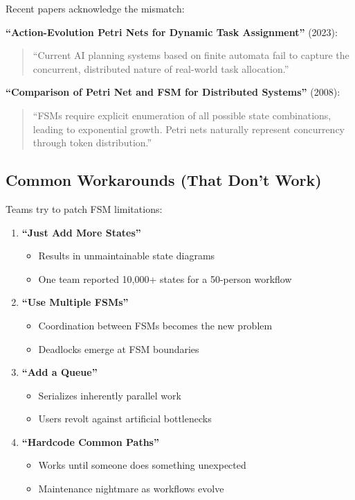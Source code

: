 \documentclass[11pt,a4paper]{article}
\begin{document}
Recent papers acknowledge the mismatch:

\textbf{``Action-Evolution Petri Nets for Dynamic Task Assignment''} (2023):
\begin{quote}
``Current AI planning systems based on finite automata fail to capture the concurrent, distributed nature of real-world task allocation.''
\end{quote}

\textbf{``Comparison of Petri Net and FSM for Distributed Systems''} (2008):
\begin{quote}
``FSMs require explicit enumeration of all possible state combinations, leading to exponential growth. Petri nets naturally represent concurrency through token distribution.''
\end{quote}

\subsection{Common Workarounds (That Don't Work)}

Teams try to patch FSM limitations:

\begin{enumerate}
\item \textbf{``Just Add More States''}
   \begin{itemize}
   \item Results in unmaintainable state diagrams
   \item One team reported 10,000+ states for a 50-person workflow
   \end{itemize}

\item \textbf{``Use Multiple FSMs''}
   \begin{itemize}
   \item Coordination between FSMs becomes the new problem
   \item Deadlocks emerge at FSM boundaries
   \end{itemize}

\item \textbf{``Add a Queue''}
   \begin{itemize}
   \item Serializes inherently parallel work
   \item Users revolt against artificial bottlenecks
   \end{itemize}

\item \textbf{``Hardcode Common Paths''}
   \begin{itemize}
   \item Works until someone does something unexpected
   \item Maintenance nightmare as workflows evolve
   \end{itemize}
\end{enumerate}
\end{document}
